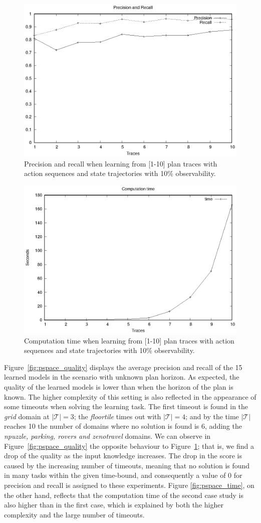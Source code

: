 \begin{figure}[hbt!]
	\centering
	\includegraphics[width=0.65\linewidth]{figures/input_size_100_10_precision.eps}
	\caption{Precision and recall when learning from [1-10] plan traces with \FO action sequences and \PO state trajectories with 10\% observability.}
	\label{fig:np_quality}
\end{figure}

\begin{figure}[hbt!]
	\centering
	\includegraphics[width=0.65\linewidth]{figures/input_size_100_10_time.eps}
	\caption{Computation time when learning from [1-10] plan traces with \FO action sequences and \PO state trajectories with 10\% observability.}
	\label{fig:np_time}
\end{figure}

Figure~\ref{fig:pspace_quality} displays the average precision and recall of the 15 learned models in the scenario with unknown plan horizon. As expected, the quality of the learned models is lower than when the horizon of the plan is known. The higher complexity of this setting is also reflected in the appearance of some timeouts when solving the learning task. The first timeout is found in the \emph{grid} domain at $|\mathcal{T}| = 3$; the \emph{floortile} times out with $|\mathcal{T}| = 4$; and by the time $|\mathcal{T}|$ reaches 10 the number of domains where no solution is found is 6, adding the \emph{npuzzle, parking, rovers and zenotravel} domains. We can observe in Figure~\ref{fig:pspace_quality} the opposite behaviour to Figure~\ref{fig:np_quality}; that is, we find a drop of the quality as the input knowledge increases. The drop in the score is caused by the increasing number of timeouts, meaning that no solution is found in many tasks within the given time-bound, and consequently a value of $0$ for precision and recall is assigned to these experiments. Figure \ref{fig:pspace_time}, on the other hand, reflects that the computation time of the second case study is also higher than in the first case, which is explained by both the higher complexity and the large number of timeouts.


